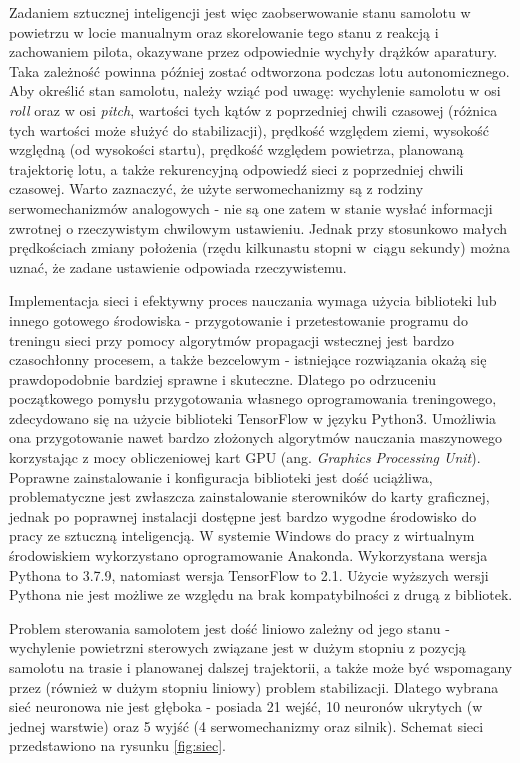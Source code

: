 \documentclass[12pt, a4paper]{article}
\begin{document}
Zadaniem sztucznej inteligencji jest więc zaobserwowanie stanu samolotu w powietrzu w locie manualnym oraz skorelowanie tego stanu z reakcją i zachowaniem pilota, okazywane przez odpowiednie wychyły drążków aparatury. Taka zależność powinna później zostać odtworzona podczas lotu autonomicznego. Aby określić stan samolotu, należy wziąć pod uwagę: wychylenie samolotu w osi \textit{roll} oraz w osi \textit{pitch}, wartości tych kątów z poprzedniej chwili czasowej (różnica tych wartości może służyć do stabilizacji), prędkość względem ziemi, wysokość względną (od wysokości startu), prędkość względem powietrza, planowaną trajektorię lotu, a także rekurencyjną odpowiedź sieci z poprzedniej chwili czasowej. Warto zaznaczyć, że użyte serwomechanizmy są z rodziny serwomechanizmów analogowych - nie są one zatem w stanie wysłać informacji zwrotnej o rzeczywistym chwilowym ustawieniu. Jednak przy stosunkowo małych prędkościach zmiany położenia (rzędu kilkunastu stopni w~ciągu sekundy) można uznać, że zadane ustawienie odpowiada rzeczywistemu.

Implementacja sieci i efektywny proces nauczania wymaga użycia biblioteki lub innego gotowego środowiska - przygotowanie i przetestowanie programu do treningu sieci przy pomocy algorytmów propagacji wstecznej jest bardzo czasochłonny procesem, a także bezcelowym - istniejące rozwiązania okażą się prawdopodobnie bardziej sprawne i skuteczne. Dlatego po odrzuceniu początkowego pomysłu przygotowania własnego oprogramowania treningowego, zdecydowano się na użycie biblioteki TensorFlow w języku Python3. Umożliwia ona przygotowanie nawet bardzo złożonych algorytmów nauczania maszynowego korzystając z mocy obliczeniowej kart GPU (ang. \textit{Graphics Processing Unit}). Poprawne zainstalowanie i konfiguracja biblioteki jest dość uciążliwa, problematyczne jest zwłaszcza zainstalowanie sterowników do karty graficznej, jednak po poprawnej instalacji dostępne jest bardzo wygodne środowisko do pracy ze sztuczną inteligencją. W systemie Windows do pracy z wirtualnym środowiskiem wykorzystano oprogramowanie Anakonda. Wykorzystana wersja Pythona to 3.7.9, natomiast wersja TensorFlow to 2.1. Użycie wyższych wersji Pythona nie jest możliwe ze względu na brak kompatybilności z drugą z bibliotek.

Problem sterowania samolotem jest dość liniowo zależny od jego stanu - wychylenie powietrzni sterowych związane jest w dużym stopniu z pozycją samolotu na trasie i planowanej dalszej trajektorii, a także może być wspomagany przez (również w dużym stopniu liniowy) problem stabilizacji. Dlatego wybrana sieć neuronowa nie jest głęboka - posiada 21 wejść, 10 neuronów ukrytych (w jednej warstwie) oraz 5 wyjść (4 serwomechanizmy oraz silnik). Schemat sieci przedstawiono na rysunku \ref{fig:siec}.
\end{document}
